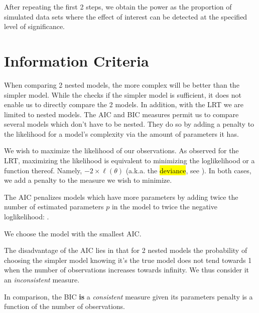 \documentclass[english]{article}
\begin{document}
\begin{multicols*}{2}
After repeating the first 2 steps, we obtain the power as the proportion of simulated data sets where the effect of interest can be detected at the specified level of significance.


\section{Information Criteria}
\begin{rappel_enhanced}[Context]
When comparing 2 nested models, the more complex will be better than the simpler model. While the \textit{\underline{}} checks if the simpler model is sufficient, it does not enable us to directly compare the 2 models. In addition, with the LRT we are limited to nested models. The AIC and BIC measures permit us to compare several models which don't have to be nested. They do so by adding a penalty to the likelihood for a model's complexity via the amount of parameters it has.

\bigskip

We wish to maximize the likelihood of our observations. As observed for the LRT, maximizing the likelihood is equivalent to minimizing the loglikelihood or a function thereof. Namely, $-2 \times \ell(\theta)$ (a.k.a. the \hl{deviance}, see \textit{\underline{}}). In both cases, we add a penalty to the measure we wish to minimize.
\end{rappel_enhanced}

\begin{definitionNOHFILLsub}
The AIC penalizes models which have more parameters by adding twice the number of estimated parameters $p$ in the model to twice the negative loglikelihood: . 

\bigskip

We choose the model with the smallest AIC.
\end{definitionNOHFILLsub}

\begin{rappel_enhanced}[Context]
The disadvantage of the AIC lies in that for 2 nested models the probability of choosing the simpler model knowing it's the true model does not tend towards 1 when the number of observations increases towards infinity. We thus consider it an \textit{inconsistent} measure.

\bigskip

In comparison, the BIC \textbf{is} a \textit{consistent} measure given its parameters penalty is a function of the number of observations.


\end{rappel_enhanced}
\end{multicols*}
\end{document}
